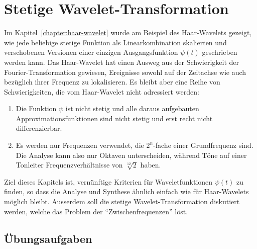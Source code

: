 %
%
%
\chapter{Stetige Wavelet-Transformation
\label{chapter:cwt}}
Im Kapitel~\ref{chapter:haar-wavelet} wurde am Beispiel des Haar-Wavelets
gezeigt, wie jede beliebige stetige Funktion als Linearkombination 
skalierten und verschobenen Versionen einer einzigen Ausgangsfunktion
$\psi(t)$ geschrieben werden kann.
Das Haar-Wavelet hat einen Ausweg aus der Schwierigkeit der
Fourier-Transformation gewiesen, Ereignisse sowohl auf der Zeitachse
wie auch bezüglich ihrer Frequenz zu lokalisieren.
Es bleibt aber eine Reihe von Schwierigkeiten, die vom Haar-Wavelet nicht
adressiert werden:
\begin{enumerate}
\item
Die Funktion $\psi$ ist nicht stetig und alle daraus aufgebauten
Approximationsfunktionen sind nicht stetig
und erst recht nicht differenzierbar.
\item
Es werden nur Frequenzen verwendet, die $2^n$-fache einer Grundfrequenz
sind.
Die Analyse kann also nur Oktaven unterscheiden, während
Töne auf einer Tonleiter Frequenzverhältnisse von $\sqrt[12]{2}$ haben.
\end{enumerate}
Ziel dieses Kapitels ist, vernünftige Kriterien für Waveletfunktionen
$\psi(t)$ zu finden, so dass die Analyse und Synthese ähnlich einfach
wie für Haar-Wavelets möglich bleibt.
Ausserdem soll die stetige Wavelet-Transformation diskutiert werden,
welche das Problem der ``Zwischenfrequenzen'' löst.






\section*{Übungsaufgaben}

